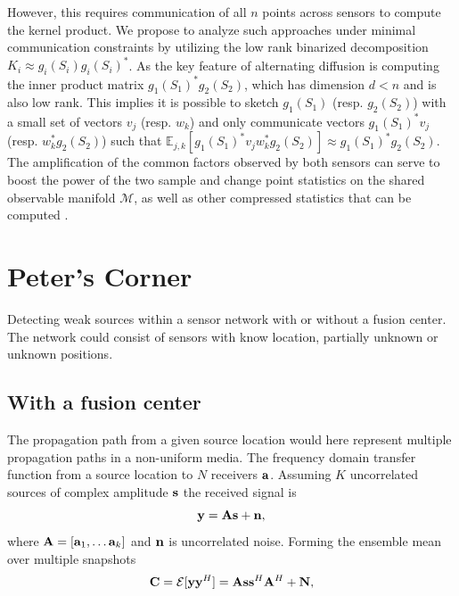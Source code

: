 \documentclass{article}
\newcommand{\comment}[3]{{\color{#1} {\bf #2 :} #3}}
\newcommand{\yoav}[1]{\comment{magenta}{Yoav}{#1}}
\begin{document}
\begin{itemize}
However, this requires communication of all $n$ points across sensors to compute the kernel product.  We propose to analyze such approaches under minimal communication constraints by utilizing the low rank binarized decomposition $K_i \approx g_i(S_i) g_i(S_i)^*$.  As the key feature of alternating diffusion is computing the inner product matrix $g_1(S_1)^* g_2(S_2)$, which has dimension $d<n$ and is also low rank.  This implies it is possible to sketch $g_1(S_1)$ (resp. $g_2(S_2)$) with a small set of vectors $v_j$ (resp. $w_k$) and only communicate vectors $g_1(S_1)^* v_j$ (resp. $w_k^* g_2(S_2)$) such that $\mathbb{E}_{j,k}[g_1(S_1)^* v_j w_k^* g_2(S_2)] \approx g_1(S_1)^* g_2(S_2)$.  The amplification of the common factors observed by both sensors can serve to boost the power of the two sample and change point statistics on the shared observable manifold $\mathcal{M}$, as well as other compressed statistics that can be computed \cite{Griboval}.
\end{itemize}

\section{Peter's Corner}


Detecting weak sources within a sensor network with or without a fusion center. The network could consist of sensors with know location, partially unknown or unknown positions.


\subsection{With a fusion center}
The propagation path from a given source location would here represent multiple propagation paths in a non-uniform media. The frequency domain transfer function from a source location to $N$ receivers ${\bf a}$. Assuming $K$ uncorrelated sources of complex amplitude $\bf s$ the received signal is 
\begin{equation}
{\bf y}={\bf A}{\bf s}+{\bf n},
\end{equation}
where ${\bf A}=[{\bf a}_1, \dots {\bf a}_k ]$  and $\bf n$ is uncorrelated noise. 
Forming the ensemble mean over multiple snapshots 
\begin{equation}
{\bf C}={\cal E}[{\bf y} {\bf y}^H]= {\bf A}{\bf s}{\bf s}^H{\bf A}^H+{\bf N},
\end{equation}
\end{document}
